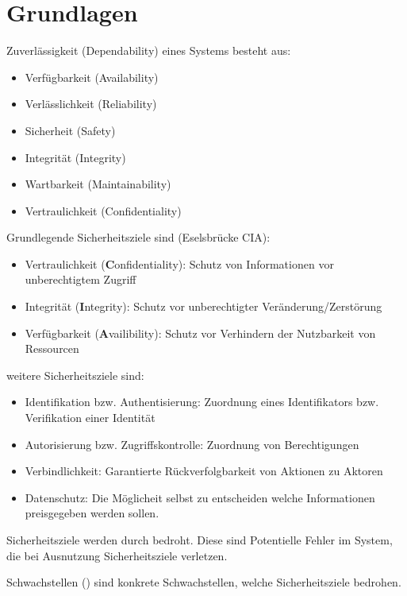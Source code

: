 \chapter{Grundlagen}
Zuverlässigkeit (Dependability) eines Systems besteht aus:
\begin{itemize}
    \item Verfügbarkeit (Availability)
    \item Verlässlichkeit (Reliability)
    \item Sicherheit (Safety)
    \item Integrität (Integrity)
    \item Wartbarkeit (Maintainability)
    \item Vertraulichkeit (Confidentiality)
\end{itemize}

Grundlegende Sicherheitsziele sind (Eselsbrücke CIA):
\begin{itemize}
    \item Vertraulichkeit (\textbf{C}onfidentiality):
        Schutz von Informationen vor unberechtigtem Zugriff
    \item Integrität (\textbf{I}ntegrity):
        Schutz vor unberechtigter Veränderung/Zerstörung
    \item Verfügbarkeit (\textbf{A}vailibility):
        Schutz vor Verhindern der Nutzbarkeit von Ressourcen
\end{itemize}
weitere Sicherheitsziele sind:
\begin{itemize}
    \item Identifikation bzw. Authentisierung:
        Zuordnung eines Identifikators bzw. Verifikation einer Identität
    \item Autorisierung bzw. Zugriffskontrolle:
        Zuordnung von Berechtigungen
    \item Verbindlichkeit:
        Garantierte Rückverfolgbarkeit von Aktionen zu Aktoren
    \item Datenschutz:
        Die Möglicheit selbst zu entscheiden welche Informationen preisgegeben werden sollen.
\end{itemize}

Sicherheitsziele werden durch  bedroht. 
Diese sind Potentielle Fehler im System, die bei Ausnutzung Sicherheitsziele verletzen.

\vspace{0.3cm}

Schwachstellen () sind konkrete Schwachstellen, welche Sicherheitsziele bedrohen.

